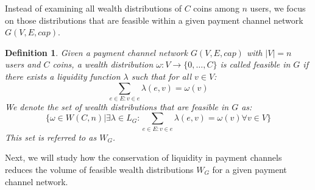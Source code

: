 \documentclass[10pt,twocolumn]{article}
\newtheorem{definition}{Definition}[section]
\newtheorem{lemma}[theorem]{Lemma}
\begin{document}


Instead of examining all wealth distributions of \( C \) coins among \( n \) users, we focus on those distributions that are feasible within a given payment channel network \( G(V,E,cap) \).

\begin{definition}
Given a payment channel network \( G(V,E,cap) \) with \( |V|=n \) users and \( C \) coins, a wealth distribution \( \omega: V \longrightarrow \{0,\dots,C\} \) is called feasible in \( G \) if there exists a liquidity function \( \lambda \) such that for all \( v \in V \):
\begin{equation}
\sum_{e \in E: v \in e} \lambda(e,v) = \omega(v)
\end{equation}
We denote the set of wealth distributions that are feasible in \( G \) as:
$$\{\omega \in W(C,n) | \exists \lambda \in L_G: \sum_{e \in E: v \in e} \lambda(e,v) = \omega(v) \forall v \in V\}$$
This set is referred to as \( W_G \).
\end{definition}

Next, we will study how the conservation of liquidity in payment channels reduces the volume of feasible wealth distributions \( W_G \) for a given payment channel network.
\end{document}
